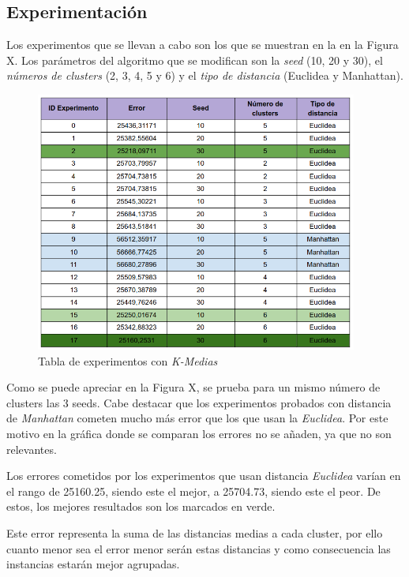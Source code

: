 \documentclass[12pt,a4paper, xcolor=table]{article}
\begin{document}
\subsection{Experimentación}

Los experimentos que se llevan a cabo son los que se muestran en la en la Figura X. Los parámetros del algoritmo que se modifican son la \textit{seed} (10, 20 y 30), el \textit{números de clusters} (2, 3, 4, 5 y 6) y el \textit{tipo de distancia} (Euclidea y Manhattan).

\begin{figure}[h]
    \centering
    \includegraphics[width=400px]{img/experimentos.png}
    \caption{Tabla de experimentos con \textit{K-Medias}}
    \label{fig:graf_exp1}
\end{figure}


Como se puede apreciar en la Figura X, se prueba para un mismo número de clusters las 3 seeds. Cabe destacar que los experimentos probados con distancia de \textit{Manhattan} cometen mucho más error que los que usan la \textit{Euclidea}. Por este motivo en la gráfica donde se comparan los errores no se añaden, ya que no son relevantes.

\vspace{2mm}

Los errores cometidos por los experimentos que usan distancia \textit{Euclidea} varían en el rango de 25160.25, siendo este el mejor, a 25704.73, siendo este el peor. De estos, los mejores resultados son los marcados en verde.

\vspace{2mm}

Este error representa la suma de las distancias medias a cada cluster, por ello cuanto menor sea el error menor serán estas distancias y como consecuencia las instancias estarán mejor agrupadas.
\end{document}

